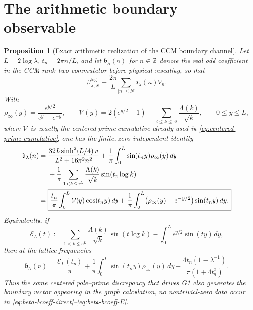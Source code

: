 \documentclass[11pt]{article}
\newtheorem{proposition}[theorem]{Proposition}
\theoremstyle{remark}
\begin{document}
\section{The arithmetic boundary observable}\label{sec:arithmetic}
\begin{proposition}[Exact arithmetic realization of the CCM boundary channel]\label{prop:beta-arithmetic-channel}
Let $L=2\log\lambda$, $t_n=2\pi n/L$, and let
$\mathfrak b_\lambda(n)$ for $n\in\mathbb Z$ denote the real odd coefficient in the CCM
rank--two commutator before physical rescaling, so that
\begin{equation}\label{eq:beta-bcoeff-expansion}
 \beta^{\log}_{\lambda,N}
 =\frac{2\pi}{L}\sum_{|n|\le N}\mathfrak b_\lambda(n)V_n.
\end{equation}
With
\[
 \rho_\infty(y)=\frac{e^{y/2}}{e^y-e^{-y}},
 \qquad
 \mathcal V(y)=2(e^{y/2}-1)
 -\sum_{2\le k\le e^y}\frac{\Lambda(k)}{\sqrt k},
 \qquad 0\le y\le L,
\]
where $\mathcal V$ is exactly the centered prime cumulative already used in
\eqref{eq:centered-prime-cumulative}, one has the finite, zero-independent
identity
\begin{align}
 \mathfrak b_\lambda(n)
 ={}&\frac{32L\sinh^2(L/4)\,n}
          {L^2+16\pi^2n^2}
 +\frac1\pi\int_0^L\sin(t_ny)\rho_\infty(y)\,dy \notag\\
 &+\frac1\pi\sum_{1<k\le e^L}
   \frac{\Lambda(k)}{\sqrt k}\sin(t_n\log k)                                      \label{eq:beta-bcoeff-direct}\\
 ={}&\boxed{\frac{t_n}{\pi}\int_0^L
       \mathcal V(y)\cos(t_ny)\,dy
 +\frac1\pi\int_0^L
   \bigl(\rho_\infty(y)-e^{-y/2}\bigr)\sin(t_ny)\,dy.}             \label{eq:beta-bcoeff-V}
\end{align}
Equivalently, if
\[
 \mathcal E_L(t)
 :=\sum_{1<k\le e^L}\frac{\Lambda(k)}{\sqrt k}\sin(t\log k)
   -\int_0^L e^{y/2}\sin(ty)\,dy,
\]
then at the lattice frequencies
\begin{equation}\label{eq:beta-bcoeff-E}
 \boxed{
 \mathfrak b_\lambda(n)
 =\frac{\mathcal E_L(t_n)}{\pi}
  +\frac1\pi\int_0^L\sin(t_ny)\rho_\infty(y)\,dy
  -\frac{4t_n(1-\lambda^{-1})}{\pi(1+4t_n^2)}.}
\end{equation}
Thus the same centered pole--prime discrepancy that drives G1 also generates
the boundary vector appearing in the graph calculation; no nontrivial-zero data occur in
\eqref{eq:beta-bcoeff-direct}--\eqref{eq:beta-bcoeff-E}.


\end{proposition}
\end{document}
